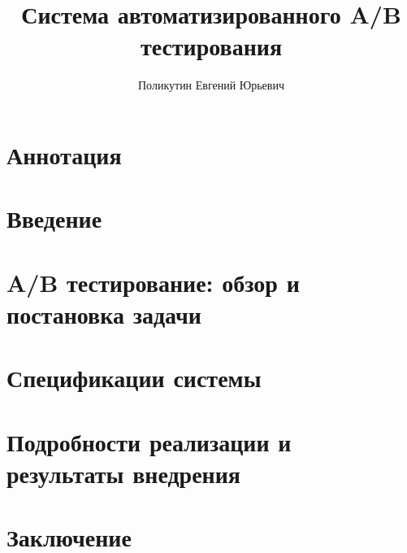 \documentclass{fefu}
\author{Поликутин Евгений Юрьевич}
\title{Система автоматизированного A/B тестирования}
\begin{document}
    \section*{Аннотация}
    
    \newpage
    \maketableofcontents
    \section*{Введение}
    
    \newpage
    \printglossary[type=main,title={Глоссарий}]
    \newpage
    \section{A/B тестирование: обзор и постановка задачи}
    
    \newpage
    \section{Спецификации системы}
    \newpage
    \section{Подробности реализации и результаты внедрения}
    \newpage
    \section*{Заключение}
    \newpage
    
    
\end{document}
